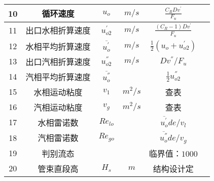\begin{table}[H]
{\begin{tabular}{|c|c|c|c|c|c|}
            10   & 循环速度                     & $ u_o $                   & $ m/s $    & $ \frac{C_RDv^{'}}{F_u} $                                                                     &      \\ \hline
            11   & 出口水相折算速度             & $ u_{o2}^{'} $            & $ m/s $    & $ \frac{(C_R - 1)Dv^{'}}{F_u} $                                                               &      \\ \hline
            12   & 水相平均折算速度             & $ \overline{u_{o}^{'}} $  & $ m/s $    & $ \frac{1}{2}(u_o + u_{o2}^{'}) $                                                             &      \\ \hline
            13   & 出口汽相折算速度             & $ u_{o2}^{''} $           & $ m/s $    & $ Dv^{''} / F_u $                                                                             &      \\ \hline
            14   & 汽相平均折算速度             & $ \overline{u_{o}^{''}} $ &            & $ \frac{1}{2}u_{o2}^{''} $                                                                    &      \\ \hline
            15   & 水相运动粘度                 & $ v_1 $                   & $ m^2/s $  & 查表                                                                                          &      \\ \hline
            16   & 汽相运动粘度                 & $ v_g $                   & $ m^2/s $  & 查表                                                                                          &      \\ \hline
            17   & 水相雷诺数                   & $ Re_{lo} $               &            & $ \overline{u_{o}^{'}} de / v_l $                                                             &      \\ \hline
            18   & 汽相雷诺数                   & $ Re_{go} $               &            & $ \overline{u_{o}^{''}} de / v_g $                                                            &      \\ \hline
            19   & 判别流态                     &                           &            & 临界值：$ 1000 $                                                                              &      \\ \hline
            20   & 管束直段高                   & $ H_s $                   & $ m $      & 结构设计定                                                                                    &      \\ \hline

\end{tabular}}
\end{table}
